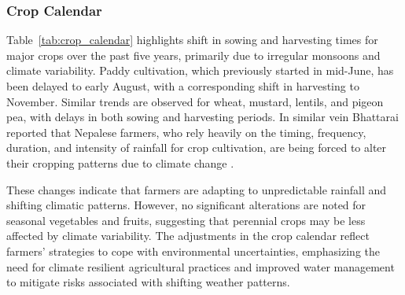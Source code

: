 \subsubsection{Crop Calendar}
Table~\ref{tab:crop_calendar} highlights shift in sowing and harvesting times for major crops over the past five years, primarily due to irregular monsoons and climate variability. Paddy cultivation, which previously started in mid-June, has been delayed to early August, with a corresponding shift in harvesting to November. Similar trends are observed for wheat, mustard, lentils, and pigeon pea, with delays in both sowing and harvesting periods. In similar vein Bhattarai reported that Nepalese farmers, who rely heavily on the timing, frequency, duration, and intensity of rainfall for crop cultivation, are being forced to alter their cropping patterns due to climate change \citep{bhattaraiImpactClimateChange2021}.

These changes indicate that farmers are adapting to unpredictable rainfall and shifting climatic patterns. However, no significant alterations are noted for seasonal vegetables and fruits, suggesting that perennial crops may be less affected by climate variability. The adjustments in the crop calendar reflect farmers' strategies to cope with environmental uncertainties, emphasizing the need for climate resilient agricultural practices and improved water management to mitigate risks associated with shifting weather patterns.



